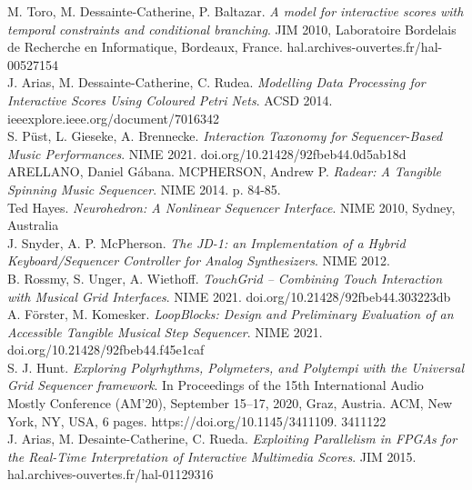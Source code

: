 \documentclass[journal,onecolumn]{IEEEtran}
\begin{document}
\begin{thebibliography}{1}
M. Toro, M. Dessainte-Catherine, P. Baltazar. \emph{A model for interactive scores with temporal constraints and conditional branching}. JIM 2010, Laboratoire Bordelais de Recherche en Informatique, Bordeaux, France. hal.archives-ouvertes.fr/hal-00527154 \\

J. Arias, M. Dessainte-Catherine, C. Rudea. \emph{Modelling Data Processing for Interactive Scores Using Coloured Petri Nets}. ACSD 2014. ieeexplore.ieee.org/document/7016342 \\

S. Püst, L. Gieseke, A. Brennecke. \emph{Interaction Taxonomy for Sequencer-Based Music Performances}. NIME 2021. doi.org/10.21428/92fbeb44.0d5ab18d \\

ARELLANO, Daniel Gábana. MCPHERSON, Andrew P. \emph{Radear: A Tangible Spinning Music Sequencer}. NIME 2014. p. 84-85. \\

Ted Hayes. \emph{Neurohedron: A Nonlinear Sequencer Interface}. NIME 2010, Sydney, Australia \\

J. Snyder, A. P. McPherson. \emph{The JD-1: an Implementation of a Hybrid Keyboard/Sequencer Controller for Analog Synthesizers}. NIME 2012. \\

B. Rossmy, S. Unger, A. Wiethoff. \emph{TouchGrid – Combining Touch Interaction with Musical Grid Interfaces}. NIME 2021. doi.org/10.21428/92fbeb44.303223db \\

A. Förster, M. Komesker. \emph{LoopBlocks: Design and Preliminary Evaluation of an Accessible Tangible Musical Step Sequencer}. NIME 2021. doi.org/10.21428/92fbeb44.f45e1caf \\

S. J. Hunt. \emph{Exploring Polyrhythms, Polymeters, and Polytempi
with the Universal Grid Sequencer framework}. In Proceedings of the 15th
International Audio Mostly Conference (AM’20), September 15–17, 2020, Graz, Austria. ACM, New York, NY, USA, 6 pages. https://doi.org/10.1145/3411109.
3411122 \\

J. Arias, M. Desainte-Catherine, C. Rueda. \emph{Exploiting Parallelism in FPGAs for the Real-Time Interpretation of Interactive Multimedia Scores}. JIM 2015. hal.archives-ouvertes.fr/hal-01129316 \\


\end{thebibliography}
\end{document}
